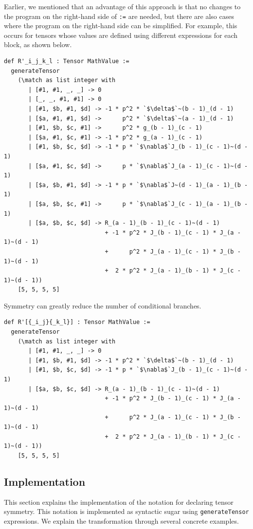 Earlier, we mentioned that an advantage of this approach is that no changes to the program on the right-hand side of \lstinline{:=} are needed, but there are also cases where the program on the right-hand side can be simplified.
For example, this occurs for tensors whose values are defined using different expressions for each block, as shown below.
\begin{lstlisting}[language=egison,numbers=none]
def R'_i_j_k_l : Tensor MathValue :=
  generateTensor
    (\match as list integer with
       | [#1, #1, _, _] -> 0
       | [_, _, #1, #1] -> 0
       | [#1, $b, #1, $d] -> -1 * p^2 * `$\delta$`~(b - 1)_(d - 1)
       | [$a, #1, #1, $d] ->      p^2 * `$\delta$`~(a - 1)_(d - 1)
       | [#1, $b, $c, #1] ->      p^2 * g_(b - 1)_(c - 1)
       | [$a, #1, $c, #1] -> -1 * p^2 * g_(a - 1)_(c - 1)
       | [#1, $b, $c, $d] -> -1 * p * `$\nabla$`J_(b - 1)_(c - 1)~(d - 1)
       | [$a, #1, $c, $d] ->      p * `$\nabla$`J_(a - 1)_(c - 1)~(d - 1)
       | [$a, $b, #1, $d] -> -1 * p * `$\nabla$`J~(d - 1)_(a - 1)_(b - 1)
       | [$a, $b, $c, #1] ->      p * `$\nabla$`J_(c - 1)_(a - 1)_(b - 1)
       | [$a, $b, $c, $d] -> R_(a - 1)_(b - 1)_(c - 1)~(d - 1)
                             + -1 * p^2 * J_(b - 1)_(c - 1) * J_(a - 1)~(d - 1)
                             +      p^2 * J_(a - 1)_(c - 1) * J_(b - 1)~(d - 1)
                             +  2 * p^2 * J_(a - 1)_(b - 1) * J_(c - 1)~(d - 1))
    [5, 5, 5, 5]
\end{lstlisting}
Symmetry can greatly reduce the number of conditional branches.
\begin{lstlisting}[language=egison,numbers=none]
def R'[{_i_j}{_k_l}] : Tensor MathValue :=
  generateTensor
    (\match as list integer with
       | [#1, #1, _, _] -> 0
       | [#1, $b, #1, $d] -> -1 * p^2 * `$\delta$`~(b - 1)_(d - 1)
       | [#1, $b, $c, $d] -> -1 * p * `$\nabla$`J_(b - 1)_(c - 1)~(d - 1)
       | [$a, $b, $c, $d] -> R_(a - 1)_(b - 1)_(c - 1)~(d - 1)
                             + -1 * p^2 * J_(b - 1)_(c - 1) * J_(a - 1)~(d - 1)
                             +      p^2 * J_(a - 1)_(c - 1) * J_(b - 1)~(d - 1)
                             +  2 * p^2 * J_(a - 1)_(b - 1) * J_(c - 1)~(d - 1))
    [5, 5, 5, 5]
\end{lstlisting}


\subsection{Implementation}

This section explains the implementation of the notation for declaring tensor symmetry.
This notation is implemented as syntactic sugar using \lstinline{generateTensor} expressions.
We explain the transformation through several concrete examples.


